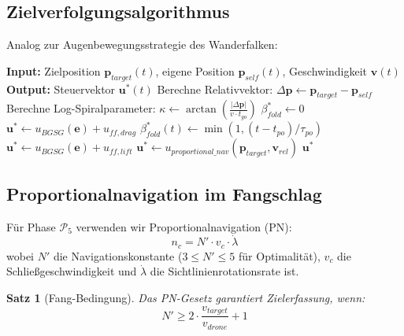 ﻿\documentclass[12pt,a4paper]{article}
\newtheorem{theorem}{Satz}[section]
\theoremstyle{remark}
\begin{document}
	\subsection{Zielverfolgungsalgorithmus}
	
	Analog zur Augenbewegungsstrategie des Wanderfalken:
	
	\begin{algorithm}[H]
		\caption{BioFalcon-Tracking-Algorithmus}
		\label{alg:tracking}
		\begin{algorithmic}[1]
			\State \textbf{Input:} Zielposition $\mathbf{p}_{target}(t)$, eigene Position $\mathbf{p}_{self}(t)$, Geschwindigkeit $\mathbf{v}(t)$
			\State \textbf{Output:} Steuervektor $\mathbf{u}^*(t)$
			\State Berechne Relativvektor: $\Delta\mathbf{p} \gets \mathbf{p}_{target} - \mathbf{p}_{self}$
			\State Berechne Log-Spiralparameter: $\kappa \gets \arctan\left(\frac{|\Delta\mathbf{p}|}{v \cdot t_{go}}\right)$
			 
			\State $\beta^*_{fold} \gets 0$ 
			\State $\mathbf{u}^* \gets u_{BGSG}(\mathbf{e}) + u_{ff,drag}$
			 
			\State $\beta^*_{fold}(t) \gets \min(1, (t - t_{po})/\tau_{po})$ 
			\State $\mathbf{u}^* \gets u_{BGSG}(\mathbf{e}) + u_{ff,lift}$
			 
			\State $\mathbf{u}^* \gets u_{proportional\_nav}(\mathbf{p}_{target}, \mathbf{v}_{rel})$
			\EndIf
			\State \Return $\mathbf{u}^*$
		\end{algorithmic}
	\end{algorithm}
	
	\subsection{Proportionalnavigation im Fangschlag}
	
	Für Phase $\mathcal{P}_5$ verwenden wir Proportionalnavigation (PN):
	\begin{equation}
		n_c = N' \cdot v_c \cdot \dot{\lambda}
	\end{equation}
	wobei $N'$ die Navigationskonstante ($3 \leq N' \leq 5$ für Optimalität), $v_c$ die Schließgeschwindigkeit und $\dot{\lambda}$ die Sichtlinienrotationsrate ist.
	
	\begin{theorem}[Fang-Bedingung]
		Das PN-Gesetz garantiert Zielerfassung, wenn:
		\begin{equation}
			N' \geq 2 \cdot \frac{v_{target}}{v_{drone}} + 1
		\end{equation}
	\end{theorem}
	
\end{document}
